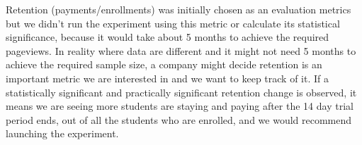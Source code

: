 \documentclass[11pt]{article}
\begin{document}
    Retention (payments/enrollments) was initially chosen as an evaluation
metrics but we didn't run the experiment using this metric or calculate
its statistical significance, because it would take about 5 months to
achieve the required pageviews. In reality where data are different and
it might not need 5 months to achieve the required sample size, a
company might decide retention is an important metric we are interested
in and we want to keep track of it. If a statistically significant and
practically significant retention change is observed, it means we are
seeing more students are staying and paying after the 14 day trial
period ends, out of all the students who are enrolled, and we would
recommend launching the experiment.


    
    
    
\end{document}
